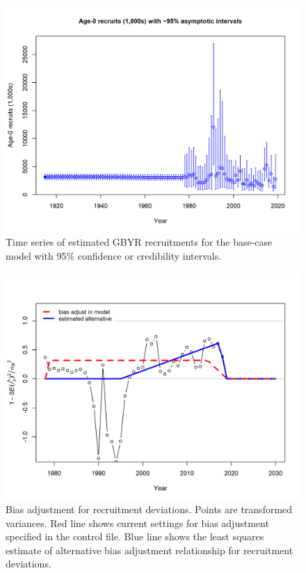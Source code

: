 \documentclass[12pt,]{article}
\begin{document}
\begin{figure}
\centering
\includegraphics{r4ss/plots_mod1/ts11_Age-0_recruits_(1000s)_with_95_asymptotic_intervals.png}
\caption{Time series of estimated GBYR recruitments for the base-case
model with 95\% confidence or credibility intervals.
\label{fig:Recruit_mod1}}
\end{figure}

\begin{figure}
\centering
\includegraphics{r4ss/plots_mod1/recruit_fit_bias_adjust.png}
\caption{Bias adjustment for recruitment deviations. Points are
transformed variances. Red line shows current settings for bias
adjustment specified in the control file. Blue line shows the least
squares estimate of alternative bias adjustment relationship for
recruitment deviations. \label{fig:recruit_fit_bias_adjust}}
\end{figure}
\end{document}
